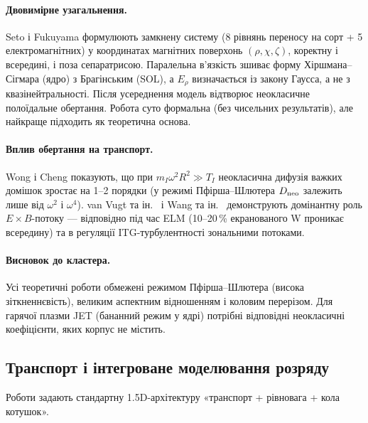 \documentclass[11pt,a4paper]{article}
\begin{document}
\paragraph{Двовимірне узагальнення.} Seto і Fukuyama \cite{Seto2014} формулюють
замкнену систему (8 рівнянь переносу на сорт + 5 електромагнітних) у координатах
магнітних поверхонь $(\rho,\chi,\zeta)$, коректну і всередині, і поза сепаратрисою.
Паралельна в'язкість зшиває форму Хіршмана--Сігмара (ядро) з Брагінським (SOL),
а $E_\rho$ визначається із закону Гаусса, а не з квазінейтральності. Після
усереднення модель відтворює неокласичне полоїдальне обертання. Робота суто
формальна (без чисельних результатів), але найкраще підходить як теоретична основа.

\paragraph{Вплив обертання на транспорт.} Wong і Cheng \cite{Wong1987} показують,
що при $m_I\omega^2R^2\gg T_I$ неокласична дифузія важких домішок зростає на
1--2 порядки (у режимі Пфірша--Шлютера $D_{\rm neo}$ залежить лише від $\omega^2$ і
$\omega^4$). van Vugt та ін.\ \cite{vanVugt2019} і Wang та ін.\ \cite{Wang2006}
демонструють домінантну роль $E\times B$-потоку --- відповідно під час ELM
(10--20\,\% екранованого W проникає всередину) та в регуляції ITG-турбулентності
зональними потоками.

\paragraph{Висновок до кластера.} Усі теоретичні роботи обмежені режимом
Пфірша--Шлютера (висока зіткненнєвість), великим аспектним відношенням і коловим
перерізом. Для гарячої плазми JET (бананний режим у ядрі) потрібні відповідні
неокласичні коефіцієнти, яких корпус не містить.

\subsection{Транспорт і інтегроване моделювання розряду}

Роботи \cite{Fukuyama1992,Fable2022,Jardin2000,Hulse1992,Park1989,Tyshchenko2021}
задають стандартну 1.5D-архітектуру «транспорт + рівновага + кола котушок».
\end{document}
